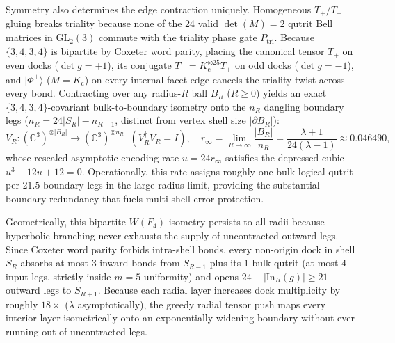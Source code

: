 Symmetry also determines the edge contraction uniquely. Homogeneous $T_+/T_+$ gluing breaks triality because none of the
24 valid $\det(M) = 2$ qutrit Bell matrices in $\mathrm{GL}_2(3)$ commute with the triality phase gate $P_{\mathrm{tri}}$.
Because $\{3,4,3,4\}$ is bipartite by Coxeter word parity, placing the canonical tensor $T_+$ on even docks
($\det g = +1$), its conjugate $T_- = K_{\mathrm{c}}^{\otimes 25} T_+$ on odd docks ($\det g = -1$), and $|\Phi^+\rangle$
($M = K_{\mathrm{c}}$) on every internal facet edge cancels the triality twist across every bond. Contracting over any
radius-$R$ ball $B_R$ ($R \ge 0$) yields an exact $\{3,4,3,4\}$-covariant bulk-to-boundary isometry onto the $n_R$
dangling boundary legs ($n_R = 24 |S_R| - n_{R-1}$, distinct from vertex shell size $|\partial B_R|$):
\begin{equation}
V_R : (\mathbb{C}^3)^{\otimes |B_R|} \to (\mathbb{C}^3)^{\otimes n_R}
\;\;(V_R^\dagger V_R = I),
\quad
r_\infty = \lim_{R\to\infty}\frac{|B_R|}{n_R} = \frac{\lambda + 1}{24(\lambda - 1)} \approx 0.046490,
\label{eq:happy-cubic}
\end{equation}
whose rescaled asymptotic encoding rate $u = 24 r_\infty$ satisfies the depressed cubic $u^3 - 12 u + 12 = 0$.
Operationally, this rate assigns roughly one bulk logical qutrit per $21.5$ boundary legs in the large-radius limit,
providing the substantial boundary redundancy that fuels multi-shell error protection.

Geometrically, this bipartite $W(F_4)$ isometry persists to all radii because hyperbolic branching never exhausts the
supply of uncontracted outward legs. Since Coxeter word parity forbids intra-shell bonds, every non-origin dock in shell
$S_R$ absorbs at most $3$ inward bonds from $S_{R-1}$ plus its $1$ bulk qutrit (at most $4$ input legs, strictly inside
$m = 5$ uniformity) and opens $24 - |\mathrm{In}_R(g)| \ge 21$ outward legs to $S_{R+1}$. Because each radial layer
increases dock multiplicity by roughly $18\times$ ($\lambda$ asymptotically), the greedy radial tensor push maps every
interior layer isometrically onto an exponentially widening boundary without ever running out of uncontracted legs.

